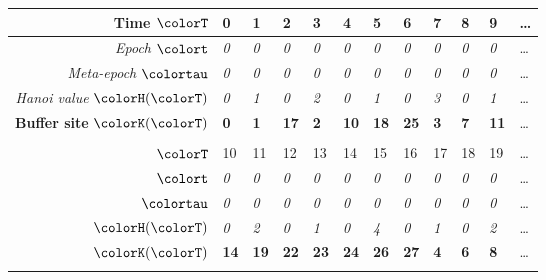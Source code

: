 \begin{figure}[htbp!]
  \centering

\begin{minipage}{\linewidth}
  \footnotesize
  \setlength{\tabcolsep}{2.5pt}
  \begin{tabularx}{\linewidth}{@{}r|*{11}{Y}@{}}

  { Time $\colorT$} &
    {0} & {1} & {2} & {3} & {4}
    & {5} & {6} & {7} & {8} & {9} & \ldots \\ \hline
  { \textit{Epoch} $\colort$} &
    \textit{0} & \textit{0} & \textit{0} & \textit{0} & \textit{0} & \textit{0} & \textit{0} & \textit{0} & \textit{0} & \textit{0} & \ldots \\
  { \textit{Meta-epoch} $\colortau$} &
    \textit{0} & \textit{0} & \textit{0} & \textit{0} & \textit{0} & \textit{0} & \textit{0} & \textit{0} & \textit{0} & \textit{0} & \ldots \\
  { \footnotesize \textit{Hanoi value} $\colorH(\colorT)$} &
    \textit{0} & \textit{1} & \textit{0} & \textit{2} & \textit{0} & \textit{1} & \textit{0} & \textit{3} & \textit{0} & \textit{1} & \ldots \\
  { \footnotesize \textbf{Buffer site} $\colorK(\colorT)$} &
    \textbf{0} & \textbf{1} & \textbf{17} & \textbf{2} & \textbf{10}
    & \textbf{18} & \textbf{25} & \textbf{3} & \textbf{7} & \textbf{11} & \ldots \\
   \\[1ex]

  { $\colorT$} &
    {10} & {11} & {12} & {13} & {14}
    & {15} & {16} & {17} & {18} & {19} & \ldots \\ \hline
  { $\colort$} &
    \textit{0} & \textit{0} & \textit{0} & \textit{0} & \textit{0} & \textit{0} & \textit{0} & \textit{0} & \textit{0} & \textit{0} & \ldots \\
  { $\colortau$} &
    \textit{0} & \textit{0} & \textit{0} & \textit{0} & \textit{0} & \textit{0} & \textit{0} & \textit{0} & \textit{0} & \textit{0} & \ldots \\
  { $\colorH(\colorT)$} &
    \textit{0} & \textit{2} & \textit{0} & \textit{1} & \textit{0} & \textit{4} & \textit{0} & \textit{1} & \textit{0} & \textit{2} & \ldots \\
  { $\colorK(\colorT)$} &
    \textbf{14} & \textbf{19} & \textbf{22} & \textbf{23} & \textbf{24}
    & \textbf{26} & \textbf{27} & \textbf{4} & \textbf{6} & \textbf{8} & \ldots \\
   \\[1ex]


\end{tabularx}
\end{minipage}
\end{figure}
